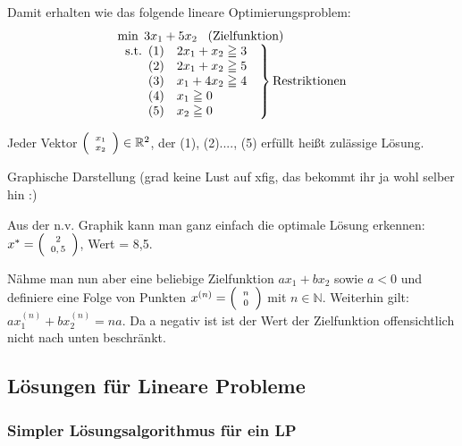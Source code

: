\documentclass[12pt,titlepage,a4paper] {report}
\newcommand{\RR}{\mathbb{R}}
\newcommand{\NN}{\mathbb{N}}
\begin{document}
Damit erhalten wie das folgende lineare Optimierungsproblem:\\
\[\begin{array}{l}
\min\; 3x_{1}+5x_{2} \;\;\; \mbox{(Zielfunktion)}\\
\left.\begin{array}{l}\mbox{s.t.}\begin{array}[t]{rl}
(1)& 2x_{1} + x_{2} \geqq 3\\
(2)&2x_{1}+ x_{2} \geqq 5\\
(3)&x_{1}+ 4x_{2} \geqq 4\\
(4)&x_{1} \geqq 0\\
(5)&x_{2} \geqq 0\\
\end{array}\end{array}\right\}\mbox{Restriktionen}\end{array}
\]

Jeder Vektor ${\scriptsize\left(\begin{array}{c}x_{1}\\x_{2}\end{array}\right)} \in \RR^{2}$, der
(1), (2)...., (5) erfüllt heißt zulässige Lösung.

Graphische Darstellung (grad keine Lust auf xfig, das bekommt ihr ja wohl
selber hin :)

Aus der n.v. Graphik kann man ganz einfach die optimale Lösung erkennen:
$x^{*} = {\scriptsize\left(\begin{array}{c}2\\0,5\end{array}\right)}$, Wert = 8,5.

Nähme man nun aber eine beliebige Zielfunktion $ax_{1}+bx_{2}$ sowie $a < 0$ 
und definiere eine Folge von Punkten $x^{(n)}= {\scriptsize\left(
\begin{array}{c}n\\ 0\end{array}\right)}$ mit $n \in \NN$. Weiterhin gilt: 
$ax_{1}^{(n)} + bx_{2}^{(n)} = na$. Da a negativ 
ist ist der Wert der Zielfunktion offensichtlich nicht nach unten
beschränkt.

\subsection{Lösungen für Lineare Probleme}

\subsubsection{Simpler Lösungsalgorithmus für ein LP}  
\end{document}
